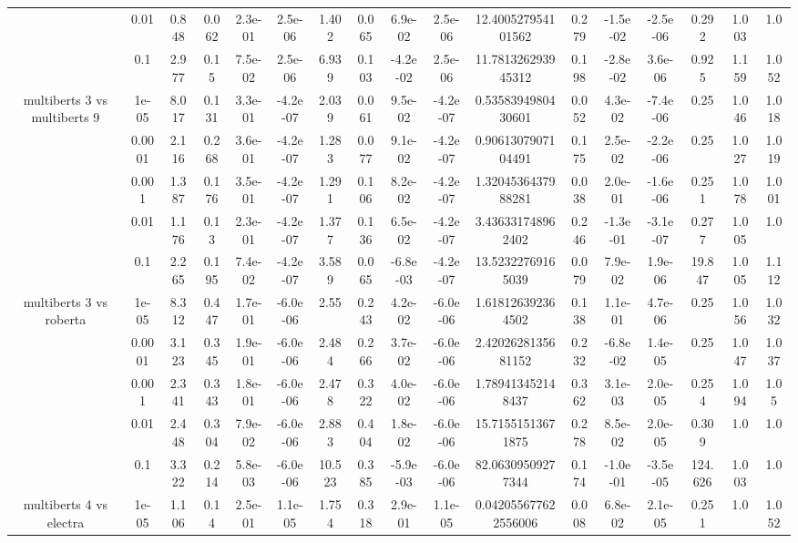 \begin{tabular}{|c|c|c|c|c|c|c|c|c|c|c|c|c|c|c|c|c|}
 & 0.01 & 0.848 & 0.062 & 2.3e-01 & 2.5e-06 & 1.402 & 0.065 & 6.9e-02 & 2.5e-06 & 12.400527954101562 & 0.279 & -1.5e-02 & -2.5e-06 & 0.292 & 1.003 & 1.0 \\
 & 0.1 & 2.977 & 0.15 & 7.5e-02 & 2.5e-06 & 6.939 & 0.103 & -4.2e-02 & 2.5e-06 & 11.781326293945312 & 0.198 & -2.8e-02 & 3.6e-06 & 0.925 & 1.159 & 1.052 \\
\hline
\multirow{5}{*}{multiberts 3 vs multiberts 9} & 1e-05 & 8.017 & 0.131 & 3.3e-01 & -4.2e-07 & 2.039 & 0.061 & 9.5e-02 & -4.2e-07 & 0.5358394980430601 & 0.052 & 4.3e-02 & -7.4e-06 & 0.25 & 1.046 & 1.018 \\
 & 0.0001 & 2.116 & 0.268 & 3.6e-01 & -4.2e-07 & 1.283 & 0.077 & 9.1e-02 & -4.2e-07 & 0.9061307907104491 & 0.175 & 2.5e-02 & -2.2e-06 & 0.25 & 1.027 & 1.019 \\
 & 0.001 & 1.387 & 0.176 & 3.5e-01 & -4.2e-07 & 1.291 & 0.106 & 8.2e-02 & -4.2e-07 & 1.3204536437988281 & 0.038 & 2.0e-01 & -1.6e-06 & 0.251 & 1.078 & 1.001 \\
 & 0.01 & 1.176 & 0.13 & 2.3e-01 & -4.2e-07 & 1.377 & 0.136 & 6.5e-02 & -4.2e-07 & 3.436331748962402 & 0.246 & -1.3e-01 & -3.1e-07 & 0.277 & 1.005 & 1.0 \\
 & 0.1 & 2.265 & 0.195 & 7.4e-02 & -4.2e-07 & 3.589 & 0.065 & -6.8e-03 & -4.2e-07 & 13.52322769165039 & 0.079 & 7.9e-02 & 1.9e-06 & 19.847 & 1.005 & 1.112 \\
\hline
\multirow{5}{*}{multiberts 3 vs roberta } & 1e-05 & 8.312 & 0.447 & 1.7e-01 & -6.0e-06 & 2.55 & 0.243 & 4.2e-02 & -6.0e-06 & 1.618126392364502 & 0.138 & 1.1e-01 & 4.7e-06 & 0.25 & 1.056 & 1.032 \\
 & 0.0001 & 3.123 & 0.345 & 1.9e-01 & -6.0e-06 & 2.484 & 0.266 & 3.7e-02 & -6.0e-06 & 2.4202628135681152 & 0.232 & -6.8e-02 & 1.4e-05 & 0.25 & 1.047 & 1.037 \\
 & 0.001 & 2.341 & 0.343 & 1.8e-01 & -6.0e-06 & 2.478 & 0.322 & 4.0e-02 & -6.0e-06 & 1.789413452148437 & 0.362 & 3.1e-03 & 2.0e-05 & 0.254 & 1.094 & 1.05 \\
 & 0.01 & 2.448 & 0.304 & 7.9e-02 & -6.0e-06 & 2.883 & 0.404 & 1.8e-02 & -6.0e-06 & 15.71551513671875 & 0.278 & 8.5e-02 & 2.0e-05 & 0.309 & 1.0 & 1.0 \\
 & 0.1 & 3.322 & 0.214 & 5.8e-03 & -6.0e-06 & 10.523 & 0.385 & -5.9e-03 & -6.0e-06 & 82.06309509277344 & 0.174 & -1.0e-01 & -3.5e-05 & 124.626 & 1.003 & 1.0 \\
\hline
\multirow{5}{*}{multiberts 4 vs electra } & 1e-05 & 1.106 & 0.14 & 2.5e-01 & 1.1e-05 & 1.754 & 0.318 & 2.9e-01 & 1.1e-05 & 0.042055677622556006 & 0.008 & 6.8e-02 & 2.1e-05 & 0.251 & 1.0 & 1.052 \\

\end{tabular}
